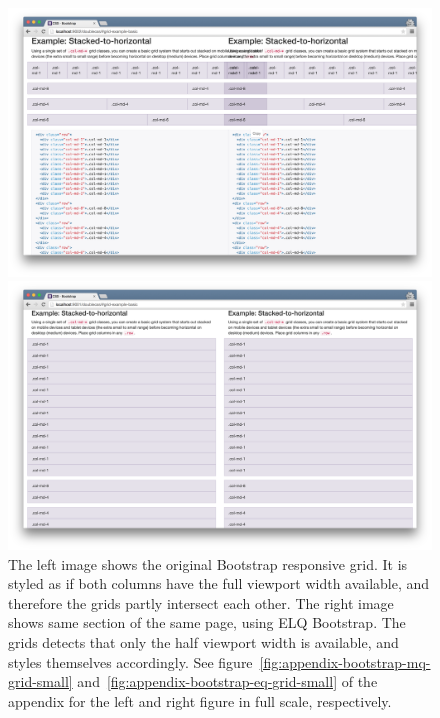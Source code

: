 \documentclass[a4paper,11pt]{kth-mag}
\begin{document}
      \begin{figure}[htb!]
        \centering
        \begin{minipage}{.5\textwidth}
          \centering
          \includegraphics[width=\linewidth]{images/bootstrap-mq-grid}
        \end{minipage}%
        \begin{minipage}{.5\textwidth}
          \centering
          \includegraphics[width=\linewidth]{images/bootstrap-eq-grid}
        \end{minipage}
        \caption{
          The left image shows the original \gls{Bootstrap} \gls{responsive} grid.
          It is styled as if both columns have the full \gls{viewport} width available, and therefore the grids partly intersect each other.
          The right image shows same section of the same page, using \gls{ELQ} \gls{Bootstrap}.
          The grids detects that only the half \gls{viewport} width is available, and styles themselves accordingly.
          See figure~\ref{fig:appendix-bootstrap-mq-grid-small} and~\ref{fig:appendix-bootstrap-eq-grid-small} of the appendix for the left and right figure in full scale, respectively.
        }
        \label{fig:eval-bootstrap-mq-eq-grid}
      \end{figure}
\end{document}
